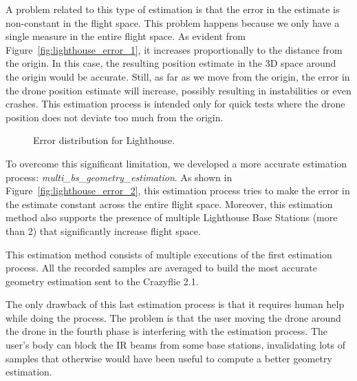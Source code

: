 A problem related to this type of estimation is that the error in the estimate is non-constant in the flight space. 
This problem happens because we only have a single measure in the entire flight space. 
As evident from Figure~\ref{fig:lighthouse_error_1}, it increases proportionally to the distance from the origin.
In this case, the resulting position estimate in the 3D space around the origin would be accurate. 
Still, as far as we move from the origin, the error in the drone position estimate will increase, possibly resulting in instabilities or even crashes.
This estimation process is intended only for quick tests where the drone position does not deviate too much from the origin.

\begin{figure}[tb]
    \centering
    \qquad
    \caption{Error distribution for Lighthouse.}\label{fig:lighthouse_error}
\end{figure}

To overcome this significant limitation, we developed a more accurate estimation process: \textit{multi\_bs\_geometry\_estimation}. 
As shown in Figure~\ref{fig:lighthouse_error_2}, this estimation process tries to make the error in the estimate constant across the entire flight space. 
Moreover, this estimation method also supports the presence of multiple Lighthouse Base Stations (more than 2) that significantly increase flight space.

This estimation method consists of multiple executions of the first estimation process.
All the recorded samples are averaged to build the most accurate geometry estimation sent to the Crazyflie 2.1.


The only drawback of this last estimation process is that it requires human help while doing the process. 
The problem is that the user moving the drone around the drone in the fourth phase is interfering with the estimation process. 
The user's body can block the IR beams from some base stations, invalidating lots of samples that otherwise would have been useful to compute a better geometry estimation.

